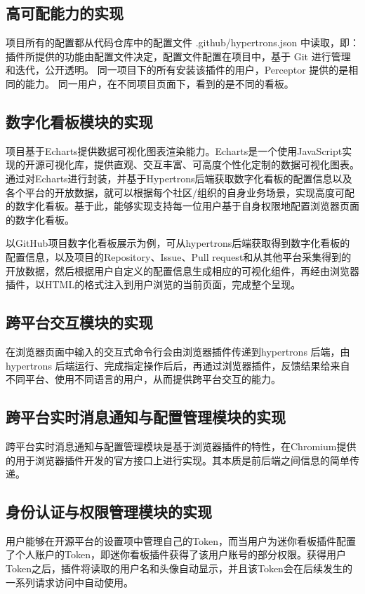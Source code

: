 \subsection{高可配能力的实现}
\par 项目所有的配置都从代码仓库中的配置文件 .github/hypertrons.json 中读取，即：
插件所提供的功能由配置文件决定，配置文件配置在项目中，基于 Git 进行管理和迭代，公开透明。
同一项目下的所有安装该插件的用户，Perceptor 提供的是相同的能力。
同一用户，在不同项目页面下，看到的是不同的看板。


\subsection{数字化看板模块的实现}
\par 项目基于Echarts提供数据可视化图表渲染能力。Echarts是一个使用JavaScript实现的开源可视化库，提供直观、交互丰富、可高度个性化定制的数据可视化图表。通过对Echarts进行封装，并基于Hypertrons后端获取数字化看板的配置信息以及各个平台的开放数据，就可以根据每个社区/组织的自身业务场景，实现高度可配的数字化看板。基于此，能够实现支持每一位用户基于自身权限地配置浏览器页面的数字化看板\cite{deqingli2018echarts}。
\par 以GitHub项目数字化看板展示为例，可从hypertrons后端获取得到数字化看板的配置信息，以及项目的Repository、Issue、Pull request和从其他平台采集得到的开放数据，然后根据用户自定义的配置信息生成相应的可视化组件，再经由浏览器插件，以HTML的格式注入到用户浏览的当前页面，完成整个呈现\cite{陈挺2016ng}。



\subsection{跨平台交互模块的实现}
\par 在浏览器页面中输入的交互式命令行会由浏览器插件传递到hypertrons 后端，由hypertrons 后端运行、完成指定操作后后，再通过浏览器插件，反馈结果给来自不同平台、使用不同语言的用户，从而提供跨平台交互的能力。

\subsection{跨平台实时消息通知与配置管理模块的实现}
\par 跨平台实时消息通知与配置管理模块是基于浏览器插件的特性，在Chromium提供的用于浏览器插件开发的官方接口上进行实现。其本质是前后端之间信息的简单传递。

\subsection{身份认证与权限管理模块的实现}
\par 用户能够在开源平台的设置项中管理自己的Token，而当用户为迷你看板插件配置了个人账户的Token，即迷你看板插件获得了该用户账号的部分权限。获得用户Token之后，插件将读取的用户名和头像自动显示，并且该Token会在后续发生的一系列请求访问中自动使用。

